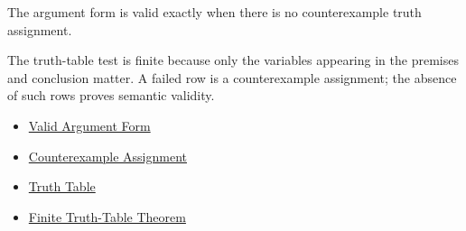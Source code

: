 \begin{remark*}[Interpretation]
The argument form is valid exactly when there is no counterexample truth
assignment.

The truth-table test is finite because only the variables appearing in the
premises and conclusion matter. A failed row is a counterexample assignment; the
absence of such rows proves semantic validity.
\end{remark*}

\begin{dependencies}
\begin{itemize}
  \item \hyperref[def:valid-argument-form-propositional-logic]{Valid Argument Form}
  \item \hyperref[def:counterexample-assignment-propositional-logic]{Counterexample Assignment}
  \item \hyperref[def:truth-table-propositional-logic]{Truth Table}
  \item \hyperref[thm:finite-truth-table-propositional-logic]{Finite Truth-Table Theorem}
\end{itemize}
\end{dependencies}
